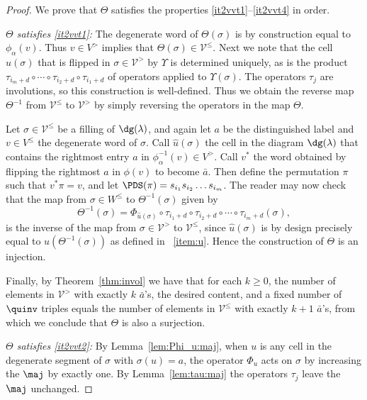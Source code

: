 \begin{proof}
We prove that $\Theta$ satisfies the properties \ref{it2vvt1}--\ref{it2vvt4} in order. 

\emph{$\Theta$ satisfies \ref{it2vvt1}:} The degenerate word of $\Theta(\sigma)$ is by construction equal to $\phi_\alpha(v)$. Thus $v\in V^{>}$ implies that $\Theta(\sigma)\in \mathcal{V}^{\leq}$. Next we note that the cell $u(\sigma)$ that is flipped in $\sigma\in \mathcal{V}^{>}$ by $\Upsilon$ is determined uniquely, as is the product $ \tau_{i_m+d}\circ\cdots\circ \tau_{i_2+d} \circ \tau_{i_1+d}$ of operators applied to $\Upsilon(\sigma)$. The operators $\tau_j$ are involutions, so this construction is well-defined. Thus we obtain the reverse map $\Theta^{-1}$ from $\mathcal{V}^{\leq}$ to $\mathcal{V}^{>}$ by simply reversing the operators in the map $\Theta$. 

Let $\sigma\in \mathcal{V}^{\leq}$ be a filling of $\dg(\lambda)$, and again let $a$ be the distinguished label and $v\in V^{\leq}$ the degenerate word of $\sigma$. Call $\widehat{u}(\sigma)$ the cell in the diagram $\dg(\lambda)$ that contains the rightmost entry $a$ in $\phi^{-1}_\alpha(v)\in V^>$. Call $v^{\ast}$ the word obtained by flipping the rightmost $a$ in $\phi(v)$ to become $\bar{a}$. Then define the permutation $\pi$ such that $v^{\ast}\pi=v$, and let $\PDS(\pi)=s_{i_1}s_{i_2}\ldots s_{i_m}$. The reader may now check that the map from $\sigma\in W^{\leq}$ to $\Theta^{-1}(\sigma)$ given by
\[
\Theta^{-1}(\sigma) = \Phi_{\widehat{u}(\sigma)}\circ \tau_{i_1+d}\circ \tau_{i_2+d} \circ\cdots\circ \tau_{i_m+d}(\sigma),
\]
is the inverse of the map from $\sigma\in \mathcal{V}^{>}$ to $\mathcal{V}^{\leq}$, since $\widehat{u}(\sigma)$ is by design precisely equal to $u(\Theta^{-1}(\sigma))$ as defined in ~\ref{item:u}. Hence the construction of $\Theta$ is an injection.

Finally, by Theorem~\ref{thm:invol} we have that for each $k\geq 0$, the number of elements in $\mathcal{V}^{>}$ with exactly $k$ $\bar{a}$'s, the desired content, and a fixed number of $\quinv$ triples equals the number of elements in $\mathcal{V}^{\leq}$ with exactly $k+1$ $\bar{a}$'s, from which we conclude that $\Theta$ is also a surjection.

\emph{$\Theta$ satisfies \ref{it2vvt2}:}
By Lemma~\ref{lem:Phi_u:maj}, when $u$ is any cell in the degenerate segment of $\sigma$ with $\sigma(u)=a$, the operator $\Phi_u$ acts on $\sigma$ by increasing the $\maj$ by exactly one. By Lemma~\ref{lem:tau:maj} the operators $\tau_j$ leave the $\maj$ unchanged.


\end{proof}
